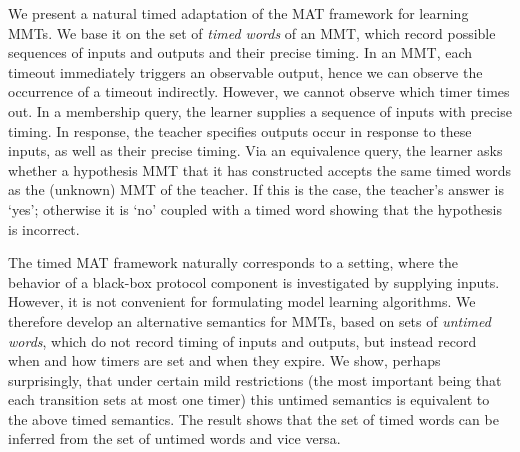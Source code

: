 \fi

We present a natural timed adaptation of the MAT framework for learning MMTs.
We base it on the set of {\em timed words} of an MMT, which record possible
sequences of inputs and outputs and their precise timing.
In an MMT, each timeout immediately triggers an observable output, hence
we can observe the occurrence of a timeout indirectly. However,
we cannot observe which timer times out.
In a membership query, the learner supplies a sequence of inputs with
precise timing.
In response, the teacher specifies outputs occur in response to these inputs,
as well as their precise timing.
Via an equivalence query, the learner asks whether a hypothesis MMT that it has
constructed accepts the same timed words
as the (unknown) MMT of the teacher. If this is the case,
the teacher's answer is `yes';
otherwise it is `no' coupled with a timed word showing that the
hypothesis is incorrect.

The timed MAT framework naturally corresponds to a setting, where the behavior
of a black-box protocol component is investigated by supplying inputs. However,
it is not convenient for formulating model learning algorithms. We therefore
develop an alternative semantics for MMTs, based on sets of {\em untimed words},
which do not record timing of inputs and outputs, but instead record when and how timers are set and when they expire. We show, perhaps surprisingly, that
under certain mild restrictions (the most important being that each transition
sets at most one timer) this untimed semantics is equivalent to the above
timed semantics. The result shows that the set of timed words can be inferred
from the set of untimed words and vice versa.

